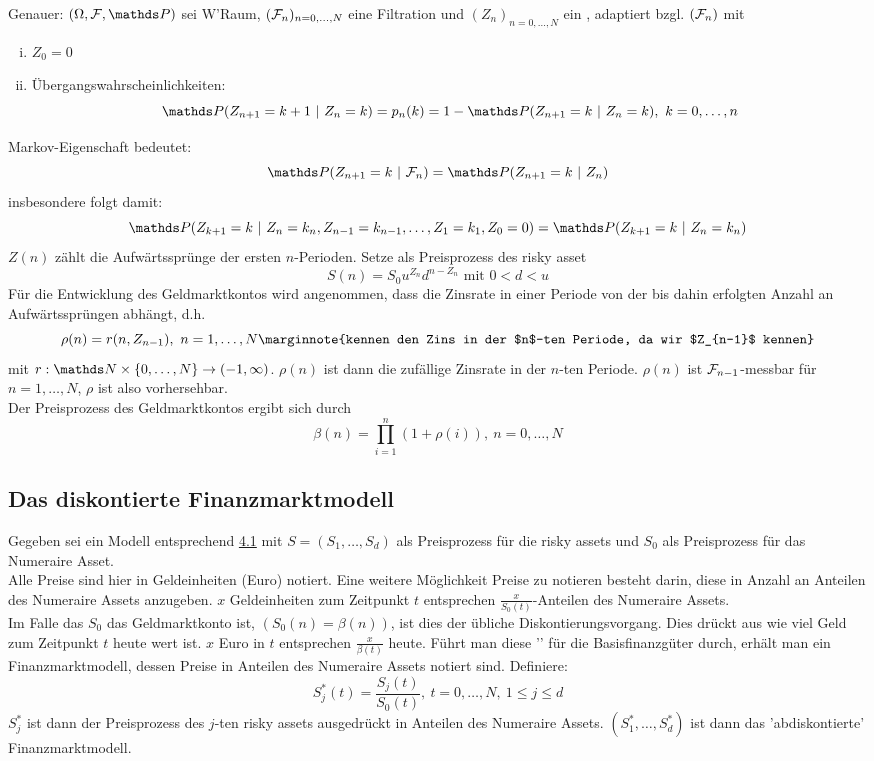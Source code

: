 \begin{enumerate}[(a)]
	Genauer: $(\Omega,\F,\Pw)$ sei W'Raum, $(\mathcal{F}_n)_{n=0,\dots,N}$ eine Filtration und $(Z_n)_{n=0,\dots,N}$ ein , adaptiert bzgl. $(\mathcal{F}_n)$ mit
	\begin{enumerate}[(i)]
		\item $Z_0=0$
		\item Übergangswahrscheinlichkeiten:
		\[
		\Pw(Z_{n+1}=k+1~|~Z_n=k)=p_n(k)=1-\Pw(Z_{n+1}=k~|~Z_n=k),~ k=0,\dots,n
		\]
	\end{enumerate}
	Markov-Eigenschaft bedeutet:
	\[
	\Pw(Z_{n+1}=k~|~\F_n)=\Pw(Z_{n+1}=k~|~Z_n)
	\]
	insbesondere folgt damit:
	\[
	\Pw(Z_{k+1}=k~|~Z_n=k_n,Z_{n-1}=k_{n-1},\dots,Z_1=k_1,Z_0=0)=\Pw(Z_{k+1}=k~|~Z_n=k_n)
	\]
	$Z(n)$ zählt die Aufwärtssprünge der ersten $n$-Perioden. Setze als Preisprozess des risky asset
	\[
	S(n)=S_0u^{Z_n}d^{n-Z_n}\text{ mit }0<d<u
	\]
	Für die Entwicklung des Geldmarktkontos wird angenommen, dass die Zinsrate in einer Periode von der bis dahin erfolgten Anzahl an Aufwärtssprüngen abhängt, d.h.
	\[
	\rho(n)=r(n,Z_{n-1}),~n=1,\dots,N \marginnote{kennen den Zins in der $n$-ten Periode, da wir $Z_{n-1}$ kennen}
	\]
	mit $r:\N\times \{0,\dots,N\}\to (-1,\infty)$. 
	$\rho(n)$ ist dann die zufällige Zinsrate in der $n$-ten Periode. 
	$\rho(n)$ ist $\mathcal{F}_{n-1}$-messbar für $n=1,\dots,N$, $\rho$ ist also vorhersehbar.\\
	Der Preisprozess des Geldmarktkontos ergibt sich durch
	\[
	\beta(n)=\prod_{i=1}^{n}(1+\rho(i)),~n=0,\dots,N
	\]
\end{enumerate}

\subsection{Das diskontierte Finanzmarktmodell}
\label{sub:disk_finanzmarktmodell}
Gegeben sei ein Modell entsprechend \hyperref[sub:beschreibung_fimarkt]{4.1} mit $S=(S_1,\dots,S_d)$ als Preisprozess für die risky assets und $S_0$ als Preisprozess für das Numeraire Asset.\\
Alle Preise sind hier in Geldeinheiten (Euro) notiert. 
Eine weitere Möglichkeit Preise zu notieren besteht darin, diese in Anzahl an Anteilen des Numeraire Assets anzugeben. 
$x$ Geldeinheiten zum Zeitpunkt $t$ entsprechen $\frac{x}{S_0(t)}$-Anteilen des Numeraire Assets.\\
Im Falle das $S_0$ das Geldmarktkonto ist, $(S_0(n)=\beta(n))$, ist dies der übliche Diskontierungsvorgang. 
Dies drückt aus wie viel Geld zum Zeitpunkt $t$ heute wert ist. 
$x$ Euro in $t$ entsprechen $\frac{x}{\beta(t)}$ heute. 
Führt man diese '' für die Basisfinanzgüter durch, erhält man ein Finanzmarktmodell, dessen Preise in Anteilen des Numeraire Assets notiert sind.
Definiere:
\[
S_j^*(t)=\frac{S_j(t)}{S_0(t)},~t=0,\dots,N,~1\le j \le d
\]
$S_j^*$ ist dann der Preisprozess des $j$-ten risky assets ausgedrückt in Anteilen des Numeraire Assets.
$(S_1^*,\dots,S_d^*)$ ist dann das 'abdiskontierte' Finanzmarktmodell.

